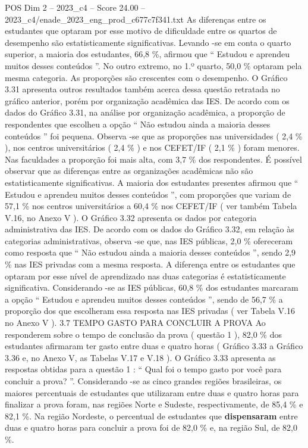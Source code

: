 \begin{textsample}{POS Dim 2 – 2023\_c4 – Score 24.00 – 2023\_c4/enade\_2023\_eng\_prod\_c677c7f341.txt}
As diferenças entre os estudantes que optaram por esse motivo de dificuldade entre os quartos de desempenho são estatisticamente significativas.
Levando -se em conta o quarto superior, a maioria dos estudantes, 66,8 \%, afirmou que “ Estudou e aprendeu muitos desses conteúdos ”.
No outro extremo, no 1.º quarto, 50,0 \% optaram pela mesma categoria.
As proporções são crescentes com o desempenho.
O Gráfico 3.31 apresenta outros resultados também acerca dessa questão retratada no gráfico anterior, porém por organização acadêmica das IES.
De acordo com os dados do Gráfico 3.31, na análise por organização acadêmica, a proporção de respondentes que escolheu a opção “ Não estudou ainda a maioria desses conteúdos ” foi pequena.
Observa -se que as proporções nas universidades ( 2,4 \% ), nos centros universitários ( 2,4 \% ) e nos CEFET/IF ( 2,1 \% ) foram menores.
Nas faculdades a proporção foi mais alta, com 3,7 \% dos respondentes.
É possível observar que as diferenças entre as organizações acadêmicas não são estatisticamente significativas.
A maioria dos estudantes presentes afirmou que “ Estudou e aprendeu muitos desses conteúdos ”, com proporções que variam de 57,1 \% nos centros universitários a 60,4 \% nos CEFET/IF ( ver também Tabela V.16, no Anexo V ).
O Gráfico 3.32 apresenta os dados por categoria administrativa das IES.
De acordo com os dados do Gráfico 3.32, em relação às categorias administrativas, observa -se que, nas IES públicas, 2,0 \% ofereceram como resposta que “ Não estudou ainda a maioria desses conteúdos ”, sendo 2,9 \% nas IES privadas com a mesma resposta.
A diferença entre os estudantes que optaram por esse nível de aprendizado nas duas categorias é estatisticamente significativa.
Considerando -se as IES públicas, 60,8 \% dos estudantes marcaram a opção “ Estudou e aprendeu muitos desses conteúdos ”, sendo de 56,7 \% a proporção dos que escolheram essa resposta nas IES privadas ( ver Tabela V.16 no Anexo V ). 3.7 TEMPO GASTO PARA CONCLUIR A PROVA Ao responderem sobre o tempo de conclusão da prova ( questão 1 ), 82,0 \% dos estudantes afirmaram ter gasto entre duas e quatro horas ( Gráfico 3.33 a Gráfico 3.36 e, no Anexo V, as Tabelas V.17 e V.18 ).
O Gráfico 3.33 apresenta as respostas obtidas para a questão 1 : “ Qual foi o tempo gasto por você para concluir a prova? ”.
Considerando -se as cinco grandes regiões brasileiras, os maiores percentuais de estudantes que utilizaram entre duas e quatro horas para finalizar a prova foram, nas regiões Norte e Sudeste, respectivamente, de 85,4 \% e 82,1 \%.
Na região Nordeste, o percentual de estudantes que \textbf{dispensaram} entre duas e quatro horas para concluir a prova foi de 82,0 \% e, na região Sul, de 82,0 \%.

\end{textsample}
